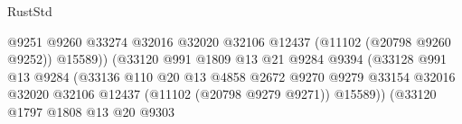 \begin{lexlean}{RustStd}
\begin{coremodule}
                                                        @9251
                                                        @9260
                                                        @33274
                                                        @32016
                                                        @32020
                                                        @32106
                                                        @12437
                                                        (@11102 (@20798 @9260 @9252))
                                                        @15589))
                                                    (@33120
                                                      @991
                                                      @1809
                                                      @13
                                                      @21
                                                      @9284
                                                      @9394
                                                      (@33128
                                                        @991
                                                        @13
                                                        @9284
                                                        (@33136
                                                          @110
                                                          @20
                                                          @13
                                                          @4858
                                                          @2672
                                                          @9270
                                                          @9279
                                                          @33154
                                                          @32016
                                                          @32020
                                                          @32106
                                                          @12437
                                                          (@11102 (@20798 @9279 @9271))
                                                          @15589))
                                                      (@33120
                                                        @1797
                                                        @1808
                                                        @13
                                                        @20
                                                        @9303

\end{coremodule}
\end{lexlean}
